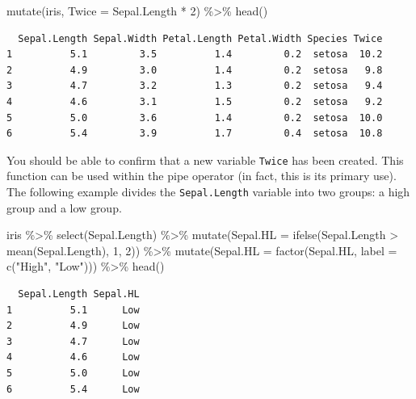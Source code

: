 \documentclass[
  a4paper,
]{book}
\newenvironment{Shaded}{\begin{snugshade}}{\end{snugshade}}
\newcommand{\AttributeTok}[1]{\textcolor[rgb]{0.40,0.45,0.13}{#1}}
\newcommand{\DecValTok}[1]{\textcolor[rgb]{0.68,0.00,0.00}{#1}}
\newcommand{\FunctionTok}[1]{\textcolor[rgb]{0.28,0.35,0.67}{#1}}
\newcommand{\NormalTok}[1]{\textcolor[rgb]{0.00,0.23,0.31}{#1}}
\newcommand{\SpecialCharTok}[1]{\textcolor[rgb]{0.37,0.37,0.37}{#1}}
\newcommand{\StringTok}[1]{\textcolor[rgb]{0.13,0.47,0.30}{#1}}
\begin{document}
\begin{Shaded}
\begin{Highlighting}[]
\FunctionTok{mutate}\NormalTok{(iris, }\AttributeTok{Twice =}\NormalTok{ Sepal.Length }\SpecialCharTok{*} \DecValTok{2}\NormalTok{) }\SpecialCharTok{\%\textgreater{}\%} \FunctionTok{head}\NormalTok{()}
\end{Highlighting}
\end{Shaded}

\begin{verbatim}
  Sepal.Length Sepal.Width Petal.Length Petal.Width Species Twice
1          5.1         3.5          1.4         0.2  setosa  10.2
2          4.9         3.0          1.4         0.2  setosa   9.8
3          4.7         3.2          1.3         0.2  setosa   9.4
4          4.6         3.1          1.5         0.2  setosa   9.2
5          5.0         3.6          1.4         0.2  setosa  10.0
6          5.4         3.9          1.7         0.4  setosa  10.8
\end{verbatim}

You should be able to confirm that a new variable \texttt{Twice} has
been created. This function can be used within the pipe operator (in
fact, this is its primary use). The following example divides the
\texttt{Sepal.Length} variable into two groups: a high group and a low
group.

\begin{Shaded}
\begin{Highlighting}[]
\NormalTok{iris }\SpecialCharTok{\%\textgreater{}\%}
  \FunctionTok{select}\NormalTok{(Sepal.Length) }\SpecialCharTok{\%\textgreater{}\%}
  \FunctionTok{mutate}\NormalTok{(}\AttributeTok{Sepal.HL =} \FunctionTok{ifelse}\NormalTok{(Sepal.Length }\SpecialCharTok{\textgreater{}} \FunctionTok{mean}\NormalTok{(Sepal.Length), }\DecValTok{1}\NormalTok{, }\DecValTok{2}\NormalTok{)) }\SpecialCharTok{\%\textgreater{}\%}
  \FunctionTok{mutate}\NormalTok{(}\AttributeTok{Sepal.HL =} \FunctionTok{factor}\NormalTok{(Sepal.HL, }\AttributeTok{label =} \FunctionTok{c}\NormalTok{(}\StringTok{"High"}\NormalTok{, }\StringTok{"Low"}\NormalTok{))) }\SpecialCharTok{\%\textgreater{}\%}
  \FunctionTok{head}\NormalTok{()}
\end{Highlighting}
\end{Shaded}

\begin{verbatim}
  Sepal.Length Sepal.HL
1          5.1      Low
2          4.9      Low
3          4.7      Low
4          4.6      Low
5          5.0      Low
6          5.4      Low
\end{verbatim}
\end{document}
